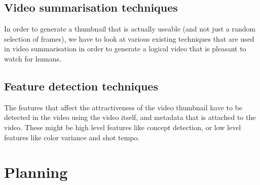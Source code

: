 \documentclass{../resources/acm_proc_article-sp}
\begin{document}
\subsection{Video summarisation techniques}

In order to generate a thumbnail that is actually useable (and not just a random selection of frames), we have to look at various existing techniques that are used in video summarisation in order to generate a logical video that is pleasant to watch for humans.

\subsection{Feature detection techniques}

The features that affect the attractiveness of the video thumbnail have to be detected in the video using the video itself, and metadata that is attached to the video. These might be high level features like concept detection, or low level features like color variance and shot tempo.




\section{Planning}



\printbibliography

\balancecolumns
\end{document}
